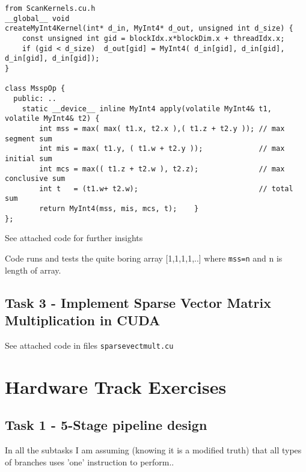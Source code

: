 \documentclass[a4paper,10pt]{article}
\begin{document}
\begin{verbatim}
from ScanKernels.cu.h
__global__ void
createMyInt4Kernel(int* d_in, MyInt4* d_out, unsigned int d_size) {
    const unsigned int gid = blockIdx.x*blockDim.x + threadIdx.x;
    if (gid < d_size)  d_out[gid] = MyInt4( d_in[gid], d_in[gid], d_in[gid], d_in[gid]);
}

class MsspOp {
  public: ..
    static __device__ inline MyInt4 apply(volatile MyInt4& t1, volatile MyInt4& t2) {
        int mss = max( max( t1.x, t2.x ),( t1.z + t2.y )); // max segment sum
        int mis = max( t1.y, ( t1.w + t2.y ));             // max initial sum
        int mcs = max(( t1.z + t2.w ), t2.z);              // max conclusive sum
        int t   = (t1.w+ t2.w);                            // total sum
        return MyInt4(mss, mis, mcs, t);    }     
};
\end{verbatim}
See attached code for further insights

Code runs and tests the quite boring array [1,1,1,1,..] where \texttt{mss=n} and n is length of array.



\subsection{Task 3 - Implement Sparse Vector Matrix Multiplication in CUDA}
See attached code in files \texttt{sparsevectmult.cu}

\newpage

\section{Hardware Track Exercises}
\subsection{Task 1 - 5-Stage pipeline design}
In all the subtasks I am assuming (knowing it is a modified truth) that all types of branches uses 'one' instruction to perform..
\end{document}
